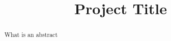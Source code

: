 \documentclass[a4paper,two side]{report}
\title{Project Title}
\begin{document}




\begin{abstract}
What is an abstract

\end{abstract}

\tableofcontents












\end{document}
